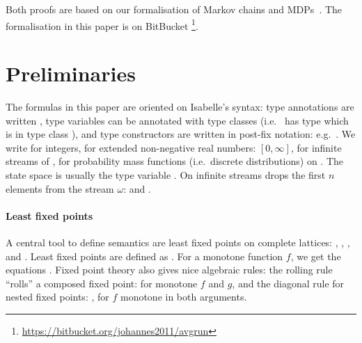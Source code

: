 \documentclass[a4paper]{llncs}
\begin{document}
Both proofs are based on our formalisation of Markov chains and MDPs~\cite{hoelzl2016mdp}. The formalisation in this paper is on BitBucket%
\footnote{\url{https://bitbucket.org/johannes2011/avgrun}}.

\section{Preliminaries}

The formulas in this paper are oriented on Isabelle's syntax: type annotations are written , type variables can be annotated with type classes  (i.e.~ has type  which is in type class ), and type constructors are written in post-fix notation: e.g.~. We write  for integers,  for extended non-negative real numbers: $[0, \infty]$,  for infinite streams of ,  for probability mass functions (i.e.~discrete distributions) on . The state space is usually the type variable .
On infinite streams  drops the first $n$ elements from the stream $\omega$:  and .

\paragraph{Least fixed points}
A central tool to define semantics are least fixed points on complete lattices: , , , and .
Least fixed points are defined as .
For a monotone function $f$, we get the equations .
Fixed point theory also gives nice algebraic rules: the rolling rule ``rolls'' a composed fixed point:  for monotone $f$ and $g$, and the diagonal rule for nested fixed points: , for $f$ monotone in both arguments.
\end{document}
